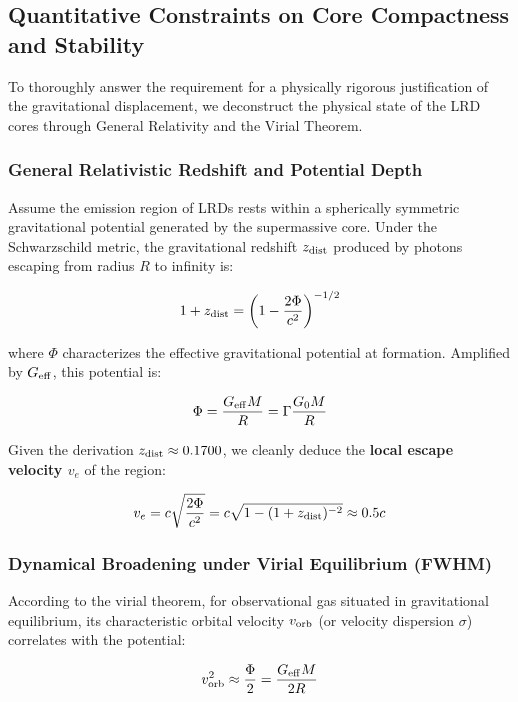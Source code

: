 \documentclass[twocolumn]{aastex631}
\begin{document}
\subsection{Quantitative Constraints on Core Compactness and Stability}
To thoroughly answer the requirement for a physically rigorous justification of the gravitational displacement, we deconstruct the physical state of the LRD cores through General Relativity and the Virial Theorem.

\subsubsection{General Relativistic Redshift and Potential Depth}
Assume the emission region of LRDs rests within a spherically symmetric gravitational potential generated by the supermassive core. Under the Schwarzschild metric, the gravitational redshift $z_{\rm dist}$ produced by photons escaping from radius $R$ to infinity is:

\begin{equation}
    1 + z_{\rm dist} = \left( 1 - \frac{2\Phi}{c^2} \right)^{-1/2}
\end{equation}

where $\Phi$ characterizes the effective gravitational potential at formation. Amplified by $G_{\rm eff}$, this potential is:

\begin{equation}
    \Phi = \frac{G_{\rm eff} M}{R} = \Gamma \frac{G_0 M}{R}
\end{equation}

Given the derivation $z_{\rm dist} \approx 0.1700$, we cleanly deduce the \textbf{local escape velocity $v_e$} of the region:

\begin{equation}
    v_e = c \sqrt{\frac{2\Phi}{c^2}} = c \sqrt{1 - (1+z_{\rm dist})^{-2}} \approx 0.5c
\end{equation}

\subsubsection{Dynamical Broadening under Virial Equilibrium (FWHM)}
According to the virial theorem, for observational gas situated in gravitational equilibrium, its characteristic orbital velocity $v_{\rm orb}$ (or velocity dispersion $\sigma$) correlates with the potential:

\begin{equation}
    v_{\rm orb}^2 \approx \frac{\Phi}{2} = \frac{G_{\rm eff} M}{2R}
\end{equation}
\end{document}
